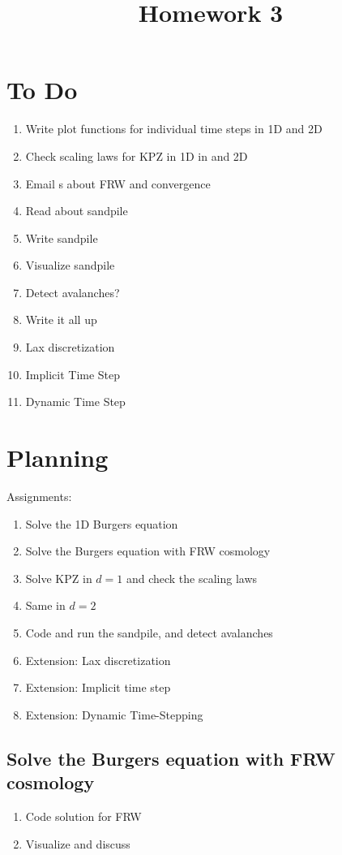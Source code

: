 \documentclass[12pt]{article}
\begin{document}
\title{Homework 3}
\maketitle

\section{To Do}
\begin{enumerate}
\item Write plot functions for individual time steps in 1D and 2D \checked
\item Check scaling laws for KPZ in 1D in and 2D
\item Email s about FRW and convergence
\item Read about sandpile
\item Write sandpile
\item Visualize sandpile
\item Detect avalanches?
\item Write it all up
\item Lax discretization
\item Implicit Time Step
\item Dynamic Time Step
\end{enumerate}

\section{Planning}
Assignments:
\begin{enumerate}
\item Solve the 1D Burgers equation \checked
\item Solve the Burgers equation with FRW cosmology
\item Solve KPZ in $d = 1$ and check the scaling laws
\item Same in $d = 2$
\item Code and run the sandpile, and detect avalanches
\item Extension: Lax discretization
\item Extension: Implicit time step
\item Extension: Dynamic Time-Stepping
\end{enumerate}

\subsection{Solve the Burgers equation with FRW cosmology}
\begin{enumerate}
\item Code solution for FRW 
\item Visualize and discuss
\end{enumerate}
\end{document}
